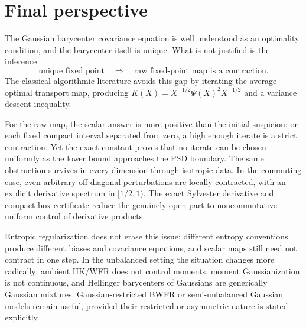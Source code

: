 \documentclass[11pt]{article}
\theoremstyle{definition}
\begin{document}
\section{Final perspective}

The Gaussian barycenter covariance equation is well understood as an
optimality condition, and the barycenter itself is unique.  What is not
justified is the inference
\[
 \text{unique fixed point}\quad\Longrightarrow\quad
 \text{raw fixed-point map is a contraction}.
\]
The classical algorithmic literature avoids this gap by iterating the average
optimal transport map, producing $K(X)=X^{-1/2}\Psi(X)^2X^{-1/2}$ and a
variance descent inequality.

For the raw map, the scalar answer is more positive than the initial suspicion:
on each fixed compact interval separated from zero, a high enough iterate is a
strict contraction.  Yet the exact constant proves that no iterate can be
chosen uniformly as the lower bound approaches the PSD boundary.  The same
obstruction survives in every dimension through isotropic data.  In the
commuting case, even arbitrary off-diagonal perturbations are locally
contracted, with an explicit derivative spectrum in $[1/2,1)$.  The exact
Sylvester derivative and compact-box certificate reduce the genuinely open
part to noncommutative uniform control of derivative products.

Entropic regularization does not erase this issue; different entropy
conventions produce different biases and covariance equations, and scalar
maps still need not contract in one step.  In the unbalanced setting the
situation changes more radically: ambient HK/WFR does not control moments,
moment Gaussianization is not continuous, and Hellinger barycenters of
Gaussians are generically Gaussian mixtures.  Gaussian-restricted BWFR or
semi-unbalanced Gaussian models remain useful, provided their restricted or
asymmetric nature is stated explicitly.
\end{document}
